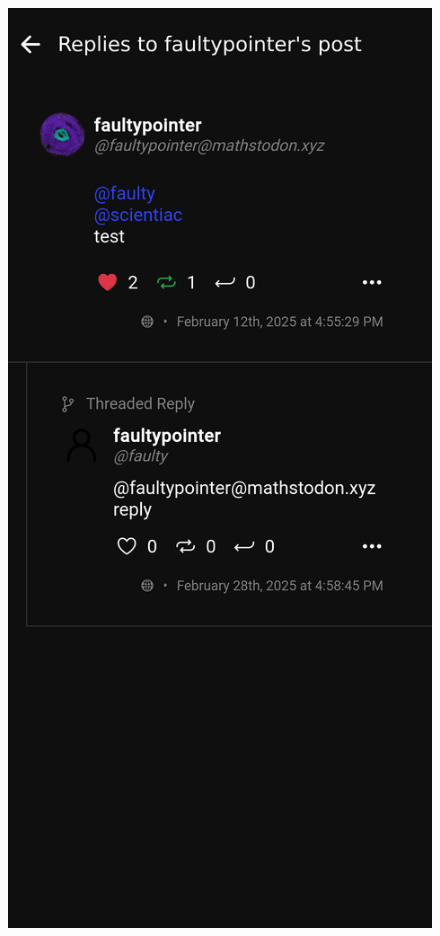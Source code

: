 \begin{figure}[htbp]
\begin{minipage}[b]{0.45\linewidth}
    \includegraphics[width=\linewidth]{Graphics/replylikereboost.png}

\end{minipage}
\end{figure}
